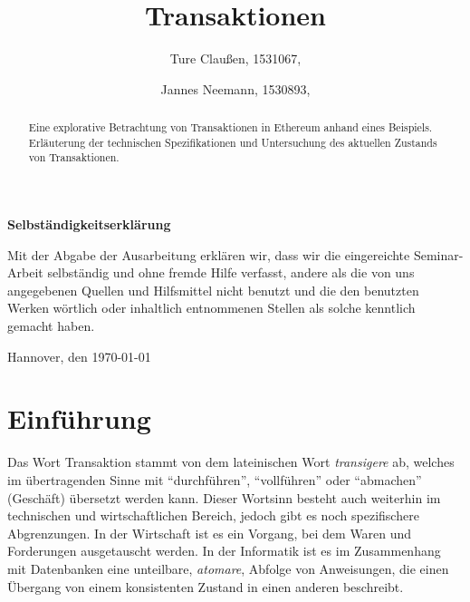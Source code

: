 \documentclass[runningheads]{llncs}
\begin{document}
\title{Transaktionen}
\author{Ture Claußen, 1531067,  \and Jannes Neemann, 1530893, }

{\def\addcontentsline#1#2#3{}\maketitle} %

\begin{center} \sffamily\bfseries Selbständigkeitserklärung \end{center}

Mit der Abgabe der Ausarbeitung erklären wir, dass wir die eingereichte Seminar-Arbeit
selbständig und ohne fremde Hilfe verfasst, andere als die von uns angegebenen Quellen
und Hilfsmittel nicht benutzt und die den benutzten Werken wörtlich oder
inhaltlich entnommenen Stellen als solche kenntlich gemacht haben.
\vspace*{7ex}

Hannover, den \today \hfill

\begin{abstract}
  Eine explorative Betrachtung von Transaktionen in Ethereum anhand eines Beispiels. Erläuterung der technischen Spezifikationen und Untersuchung des aktuellen Zustands von Transaktionen.

\end{abstract}

\section{Einführung}
Das Wort Transaktion stammt von dem lateinischen Wort \textit{transigere} ab, welches im übertragenden Sinne mit "`durchführen"', "`vollführen"' oder "`abmachen"' (Geschäft) übersetzt werden kann. \cite{noauthor_transigere_nodate} Dieser Wortsinn besteht auch weiterhin im technischen und wirtschaftlichen Bereich, jedoch gibt es noch spezifischere Abgrenzungen. In der Wirtschaft ist es ein Vorgang, bei dem Waren und Forderungen ausgetauscht werden. \cite[S. 18 f.]{ehrlicher_kompendium_1975} In der Informatik ist es im Zusammenhang mit Datenbanken eine unteilbare, \textit{atomare}, Abfolge von Anweisungen, die einen Übergang von einem konsistenten Zustand in einen anderen beschreibt. \cite[S.520]{herold_grundlagen_2017}
\end{document}
